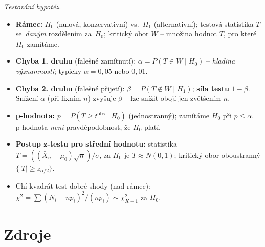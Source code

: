 \documentclass[11pt,a4paper]{article}
\begin{document}
\begin{poznamka}
\smallskip
\emph{Testování hypotéz.}
\begin{itemize}
  \item \textbf{Rámec:} $H_0$ (nulová, konzervativní) vs.\ $H_1$ (alternativní); testová statistika $T$ se~\emph{daným} rozdělením za~$H_0$; kritický obor $W$ -- množina hodnot $T$, pro které $H_0$ zamítáme.
  \item \textbf{Chyba 1. druhu} (falešné zamítnutí): $\alpha=P(T\in W\mid H_0)$ -- \emph{hladina významnosti}; typicky $\alpha=0{,}05$ nebo $0{,}01$.
  \item \textbf{Chyba 2. druhu} (falešné přijetí): $\beta=P(T\notin W\mid H_1)$; \textbf{síla testu} $1-\beta$. Snížení $\alpha$ (při fixním $n$) zvyšuje $\beta$ -- lze snížit obojí jen zvětšením $n$.
  \item \textbf{p-hodnota:} $p=P(T\ge t^{\mathrm{obs}}\mid H_0)$ (jednostranný); zamítáme $H_0$ při $p\le\alpha$. p-hodnota \emph{není} pravděpodobnost, že $H_0$ platí.
  \item \textbf{Postup z-testu pro střední hodnotu:} statistika $T=((\bar X_n-\mu_0)\sqrt{n})/\sigma$, za $H_0$ je $T\approx N(0,1)$; kritický obor oboustranný $\{|T|\ge z_{\alpha/2}\}$.
  \item Chí-kvadrát test dobré shody (nad rámec): $\chi^2=\sum(N_i-np_i)^2/(np_i)\sim\chi^2_{K-1}$ za $H_0$.
\end{itemize}
\end{poznamka}

\section*{Zdroje}
\end{document}
